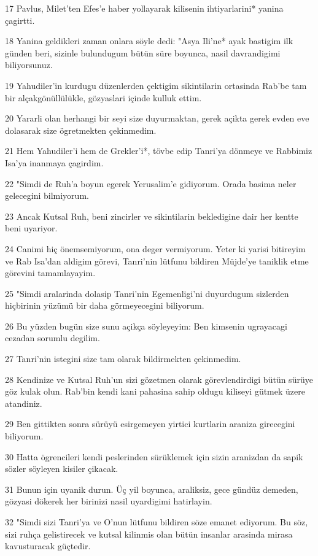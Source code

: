 \par 17 Pavlus, Milet'ten Efes'e haber yollayarak kilisenin ihtiyarlarini* yanina çagirtti.
\par 18 Yanina geldikleri zaman onlara söyle dedi: "Asya Ili'ne* ayak bastigim ilk günden beri, sizinle bulundugum bütün süre boyunca, nasil davrandigimi biliyorsunuz.
\par 19 Yahudiler'in kurdugu düzenlerden çektigim sikintilarin ortasinda Rab'be tam bir alçakgönüllülükle, gözyaslari içinde kulluk ettim.
\par 20 Yararli olan herhangi bir seyi size duyurmaktan, gerek açikta gerek evden eve dolasarak size ögretmekten çekinmedim.
\par 21 Hem Yahudiler'i hem de Grekler'i*, tövbe edip Tanri'ya dönmeye ve Rabbimiz Isa'ya inanmaya çagirdim.
\par 22 "Simdi de Ruh'a boyun egerek Yerusalim'e gidiyorum. Orada basima neler gelecegini bilmiyorum.
\par 23 Ancak Kutsal Ruh, beni zincirler ve sikintilarin bekledigine dair her kentte beni uyariyor.
\par 24 Canimi hiç önemsemiyorum, ona deger vermiyorum. Yeter ki yarisi bitireyim ve Rab Isa'dan aldigim görevi, Tanri'nin lütfunu bildiren Müjde'ye taniklik etme görevini tamamlayayim.
\par 25 "Simdi aralarinda dolasip Tanri'nin Egemenligi'ni duyurdugum sizlerden hiçbirinin yüzümü bir daha görmeyecegini biliyorum.
\par 26 Bu yüzden bugün size sunu açikça söyleyeyim: Ben kimsenin ugrayacagi cezadan sorumlu degilim.
\par 27 Tanri'nin istegini size tam olarak bildirmekten çekinmedim.
\par 28 Kendinize ve Kutsal Ruh'un sizi gözetmen olarak görevlendirdigi bütün sürüye göz kulak olun. Rab'bin kendi kani pahasina sahip oldugu kiliseyi gütmek üzere atandiniz.
\par 29 Ben gittikten sonra sürüyü esirgemeyen yirtici kurtlarin araniza girecegini biliyorum.
\par 30 Hatta ögrencileri kendi peslerinden sürüklemek için sizin aranizdan da sapik sözler söyleyen kisiler çikacak.
\par 31 Bunun için uyanik durun. Üç yil boyunca, araliksiz, gece gündüz demeden, gözyasi dökerek her birinizi nasil uyardigimi hatirlayin.
\par 32 "Simdi sizi Tanri'ya ve O'nun lütfunu bildiren söze emanet ediyorum. Bu söz, sizi ruhça gelistirecek ve kutsal kilinmis olan bütün insanlar arasinda mirasa kavusturacak güçtedir.
